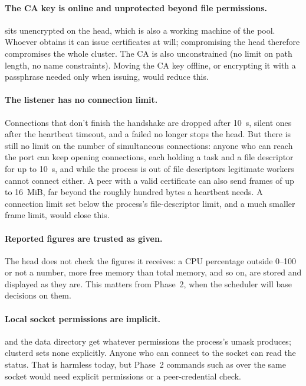 \documentclass{article}
\begin{document}
\paragraph{The CA key is online and unprotected beyond file permissions.}
 sits unencrypted on the head, which is also a working
machine of the pool. Whoever obtains it can issue certificates at will;
compromising the head therefore compromises the whole cluster. The CA is
also unconstrained (no limit on path length, no name constraints). Moving
the CA key offline, or encrypting it with a passphrase needed only when
issuing, would reduce this.

\paragraph{The listener has no connection limit.}
Connections that don't finish the handshake are dropped after 10~s,
silent ones after the heartbeat timeout, and a failed  no
longer stops the head. But there is still no limit on the number of
simultaneous connections: anyone who can reach the port can keep opening
connections, each holding a task and a file descriptor for up to 10~s,
and while the process is out of file descriptors legitimate workers
cannot connect either. A peer with a valid certificate can also send
frames of up to 16~MiB, far beyond the roughly hundred bytes a heartbeat
needs. A connection limit set below the process's file-descriptor limit,
and a much smaller frame limit, would close this.

\paragraph{Reported figures are trusted as given.}
The head does not check the figures it receives: a CPU percentage outside
0--100 or not a number, more free memory than total memory, and so on,
are stored and displayed as they are. This matters from Phase~2, when the
scheduler will base decisions on them.

\paragraph{Local socket permissions are implicit.}
 and the data directory get whatever permissions the
process's umask produces; clusterd sets none explicitly. Anyone who can
connect to the socket can read the status. That is harmless today, but
Phase~2 commands such as  over the same socket would need
explicit permissions or a peer-credential check.
\end{document}

